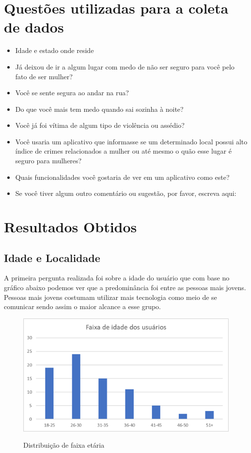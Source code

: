 \section{Questões utilizadas para a coleta de dados}
\begin{itemize}
  \item Idade e estado onde reside
  \item Já deixou de ir a algum lugar com medo de não ser seguro para você pelo fato de ser mulher?
  \item Você se sente segura ao andar na rua?
  \item Do que você mais tem medo quando sai sozinha à noite?
  \item Você já foi vítima de algum tipo de violência ou assédio?
  \item Você usaria um aplicativo que informasse se um determinado local possui alto índice de crimes relacionados a mulher ou até mesmo o quão esse lugar é seguro para mulheres?
  \item Quais funcionalidades você gostaria de ver em um aplicativo como este?
  \item Se você tiver algum outro comentário ou sugestão, por favor, escreva aqui:
\end{itemize}

\section{Resultados Obtidos}
\subsection{Idade e Localidade}
A primeira pergunta realizada foi sobre a idade do usuário que com base no gráfico abaixo podemos ver que a predominância foi entre as pessoas mais jovens. Pessoas mais jovens costumam utilizar mais tecnologia como meio de se comunicar sendo assim o maior alcance a esse grupo. 

\begin{figure}[htbp]
  \begin{center}
  \includegraphics[width=1.0\linewidth]{images/distribuicao-idade.png}\\
  \end{center}
  \caption[Distribuição de faixa etária]{Distribuição de faixa etária}
  \label{fig:mapa-empatia=inicial}
\end{figure}

